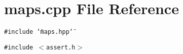 \section{maps.cpp File Reference}
\label{maps_8cpp}
{\tt \#include \char`\"{}maps.hpp\char`\"{}}\par
{\tt \#include $<$assert.h$>$}\par
